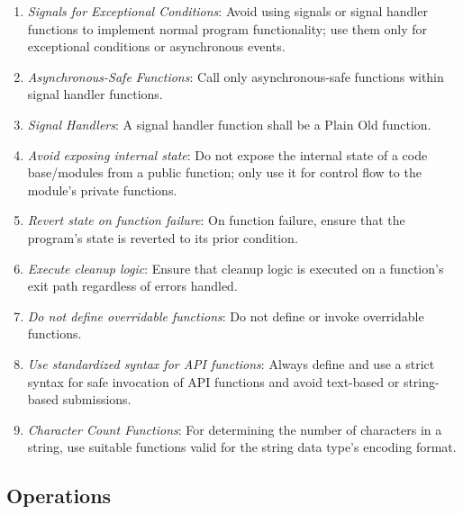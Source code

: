 \documentclass[9pt]{IEEEtran} %
\begin{document}
\begin{enumerate}
  \item \textit{Signals for Exceptional Conditions}: Avoid using signals or signal handler functions to implement normal program functionality; use them only for exceptional conditions or asynchronous events.
  \item \textit{Asynchronous-Safe Functions}: Call only asynchronous-safe functions within signal handler functions. 
  \item \textit{Signal Handlers}: A signal handler function shall be a Plain Old function.
  \item \textit{Avoid exposing internal state}: Do not expose the internal state of a code base/modules from a public function; only use it for control flow to the module's private functions.
  \item \textit{Revert state on function failure}: On function failure, ensure that the program's state is reverted to its prior condition.
  \item \textit{Execute cleanup logic}: Ensure that cleanup logic is executed on a function's exit path regardless of errors handled.
  \item \textit{Do not define overridable functions}: Do not define or invoke overridable functions.
  \item \textit{Use standardized syntax for API functions}: Always define and use a strict syntax for safe invocation of API functions and avoid text-based or string-based submissions.
  \item \textit{Character Count Functions}: For determining the number of characters in a string, use suitable functions valid for the string data type's encoding format.
\end{enumerate}

\subsection{Operations}
\label{ESSOperations}
\end{document}
